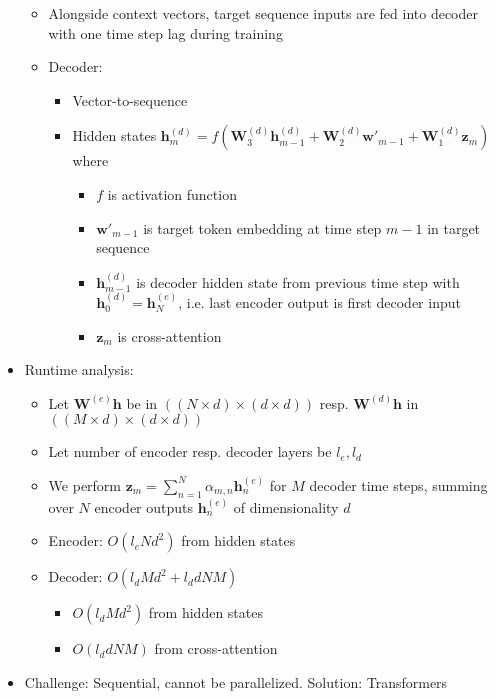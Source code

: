 \begin{itemize}
\begin{itemize}
\begin{itemize}
\begin{itemize}
\begin{itemize}
                \end{itemize}
            \end{itemize}
        \end{itemize}
        \item Alongside context vectors, target sequence inputs are fed into decoder with one time step lag during training
        \item Decoder: 
        \begin{itemize}
            \item Vector-to-sequence
            \item Hidden states $\boldsymbol{h}_m^{(d)} = f ( \boldsymbol{W}_3^{(d)} \boldsymbol{h}_{m-1}^{(d)} + \boldsymbol{W}_2^{(d)} \boldsymbol{w'}_{m-1} + \boldsymbol{W}_1^{(d)} \boldsymbol{z}_m )$ where
            \begin{itemize}
                \item $f$ is activation function
                \item $\boldsymbol{w'}_{m-1}$ is target token embedding at time step $m-1$ in target sequence
                \item $\boldsymbol{h}_{m-1}^{(d)}$ is decoder hidden state from previous time step with $\boldsymbol{h}_0^{(d)} = \boldsymbol{h}_N^{(e)}$, i.e. last encoder output is first decoder input
                \item $\boldsymbol{z}_m$ is cross-attention
            \end{itemize} 
        \end{itemize}
    \end{itemize}
    \item Runtime analysis:
    \begin{itemize}
        \item Let $\boldsymbol{W}^{(e)} \boldsymbol{h}$ be in $((N \times d) \times (d \times d))$ resp. $\boldsymbol{W}^{(d)} \boldsymbol{h}$ in $((M \times d) \times (d \times d))$
        \item Let number of encoder resp. decoder layers be $l_e, l_d$
        \item We perform $\boldsymbol{z}_m = \sum_{n=1}^N \alpha_{m,n} \boldsymbol{h}_n^{(e)}$ for $M$ decoder time steps, summing over $N$ encoder outputs $\boldsymbol{h}_n^{(e)}$ of dimensionality $d$
        \item Encoder: $O(l_e N d^2)$ from hidden states
        \item Decoder: $O(l_d M d^2 + l_d  d N M)$
        \begin{itemize}
            \item $O(l_d M d^2)$ from hidden states
            \item $O(l_d d N M)$ from cross-attention
        \end{itemize}
    \end{itemize}
    \item Challenge: Sequential, cannot be parallelized. Solution: Transformers
\end{itemize}

